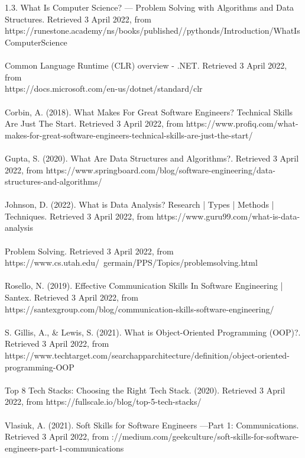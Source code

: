 \documentclass[a4paper, 11pt]{report}
\begin{document}
	\\
	\\
	1.3. What Is Computer Science? — Problem Solving with Algorithms and Data Structures. Retrieved 3 April 2022, from \\https://runestone.academy/ns/books/published//pythonds/Introduction/WhatIsComputerScience
	\\
	\\
	Common Language Runtime (CLR) overview - .NET. Retrieved 3 April 2022, from \\https://docs.microsoft.com/en-us/dotnet/standard/clr
	\\
	\\
	Corbin, A. (2018). What Makes For Great Software Engineers? Technical Skills Are Just The Start. Retrieved 3 April 2022, from https://www.profiq.com/what-makes-for-great-software-engineers-technical-skills-are-just-the-start/
	\\
	\\
	Gupta, S. (2020). What Are Data Structures and Algorithms?. Retrieved 3 April 2022, from https://www.springboard.com/blog/software-engineering/data-structures-and-algorithms/
	\\
	\\
	Johnson, D. (2022). What is Data Analysis? Research | Types | Methods | Techniques. Retrieved 3 April 2022, from https://www.guru99.com/what-is-data-analysis
	\\
	\\
	Problem Solving. Retrieved 3 April 2022, from 
	\\https://www.cs.utah.edu/~germain/PPS/Topics/problemsolving.html
	\\
	\\
	Rosello, N. (2019). Effective Communication Skills In Software Engineering | Santex. Retrieved 3 April 2022, from https://santexgroup.com/blog/communication-skills-software-engineering/
	\\
	\\
	S. Gillis, A., & Lewis, S. (2021). What is Object-Oriented Programming (OOP)?. Retrieved 3 April 2022, from https://www.techtarget.com/searchapparchitecture/definition/object-oriented-programming-OOP
	\\
	\\
	Top 8 Tech Stacks: Choosing the Right Tech Stack. (2020). Retrieved 3 April 2022, from https://fullscale.io/blog/top-5-tech-stacks/
	\\
	\\
	Vlasiuk, A. (2021). Soft Skills for Software Engineers —Part 1: Communications. Retrieved 3 April 2022, from \https://medium.com/geekculture/soft-skills-for-software-engineers-part-1-communications
\end{document}
